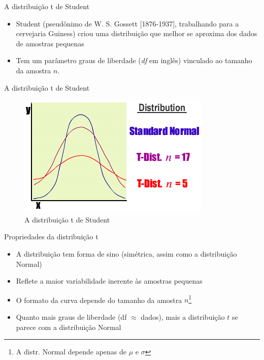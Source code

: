 \documentclass{beamer}
\begin{document}
\begin{frame}{A distribuição t de Student}
  \begin{itemize}
  \item Student (pseudônimo de W. S. Gossett [1876-1937], trabalhando
    para a cervejaria Guiness) criou uma distribuição que melhor se
    aproxima dos dados de amostras pequenas
  \item Tem um parâmetro \alert{graus de liberdade} ({\em df} em inglês) vinculado ao tamanho da amostra $n$.
  \end{itemize}
\end{frame}

\begin{frame}{A distribuição t de Student}
  \begin{figure}
    \includegraphics[height=0.7\textheight]{Inf_II/t_graph}
    \caption{A distribuição t de Student}
  \end{figure}
\end{frame}

\begin{frame}{Propriedades da distribuição t}
  \begin{itemize}
  \item A distribuição tem forma de sino (simétrica, assim como a
    distribuição Normal)
  \item Reflete a maior variabilidade inerente às amostras pequenas
  \item O formato da curva depende do tamanho da amostra $n$\footnote{A distr. Normal depende apenas de $\mu$ e $\sigma$}
  \item Quanto mais graus de liberdade (df $\approx$ dados), mais a distribuição
    $t$ se parece com a distribuição Normal
  \end{itemize}
\end{frame}
\end{document}
